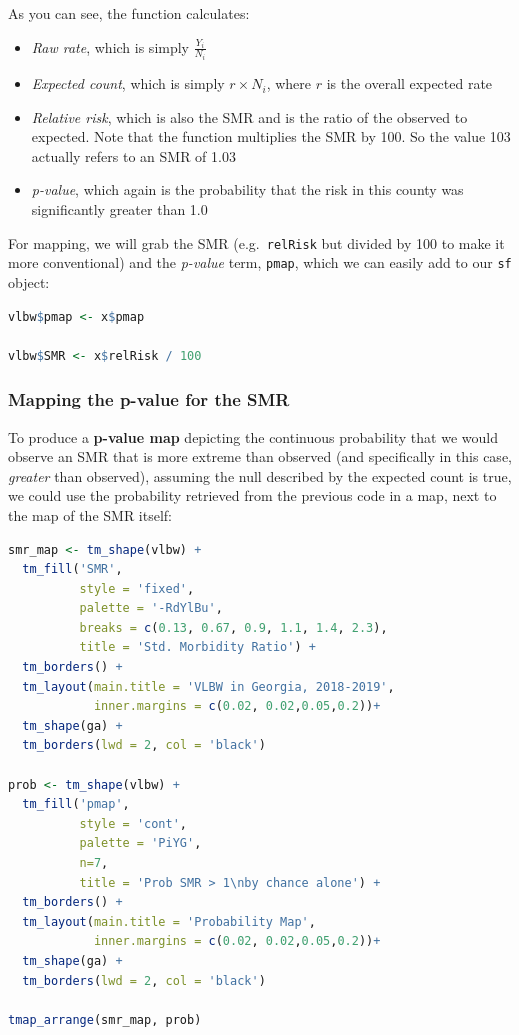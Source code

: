 \documentclass[
]{book}
\newcommand{\passthrough}[1]{#1}
\providecommand{\tightlist}{%
  \setlength{\itemsep}{0pt}\setlength{\parskip}{0pt}}
\begin{document}
As you can see, the function calculates:

\begin{itemize}
\tightlist
\item
  \emph{Raw rate}, which is simply \(\frac{Y_i}{N_i}\)
\item
  \emph{Expected count}, which is simply \(r\times N_i\), where \(r\) is the overall expected rate
\item
  \emph{Relative risk}, which is also the SMR and is the ratio of the observed to expected. Note that the function multiplies the SMR by 100. So the value 103 actually refers to an SMR of 1.03
\item
  \emph{p-value}, which again is the probability that the risk in this county was significantly greater than 1.0
\end{itemize}

For mapping, we will grab the SMR (e.g.~\passthrough{\lstinline!relRisk!} but divided by 100 to make it more conventional) and the \emph{p-value} term, \passthrough{\lstinline!pmap!}, which we can easily add to our \passthrough{\lstinline!sf!} object:

\begin{lstlisting}[language=R]
vlbw$pmap <- x$pmap

vlbw$SMR <- x$relRisk / 100
\end{lstlisting}

\hypertarget{mapping-the-p-value-for-the-smr}{%
\subsubsection{Mapping the p-value for the SMR}\label{mapping-the-p-value-for-the-smr}}

To produce a \textbf{p-value map} depicting the continuous probability that we would observe an SMR that is more extreme than observed (and specifically in this case, \emph{greater} than observed), assuming the null described by the expected count is true, we could use the probability retrieved from the previous code in a map, next to the map of the SMR itself:

\begin{lstlisting}[language=R]
smr_map <- tm_shape(vlbw) +
  tm_fill('SMR',
          style = 'fixed', 
          palette = '-RdYlBu',
          breaks = c(0.13, 0.67, 0.9, 1.1, 1.4, 2.3),
          title = 'Std. Morbidity Ratio') + 
  tm_borders() +
  tm_layout(main.title = 'VLBW in Georgia, 2018-2019',
            inner.margins = c(0.02, 0.02,0.05,0.2))+
  tm_shape(ga) +
  tm_borders(lwd = 2, col = 'black')

prob <- tm_shape(vlbw) + 
  tm_fill('pmap',
          style = 'cont',
          palette = 'PiYG',
          n=7,
          title = 'Prob SMR > 1\nby chance alone') + 
  tm_borders() + 
  tm_layout(main.title = 'Probability Map',
            inner.margins = c(0.02, 0.02,0.05,0.2))+
  tm_shape(ga) +
  tm_borders(lwd = 2, col = 'black')

tmap_arrange(smr_map, prob)
\end{lstlisting}
\end{document}
